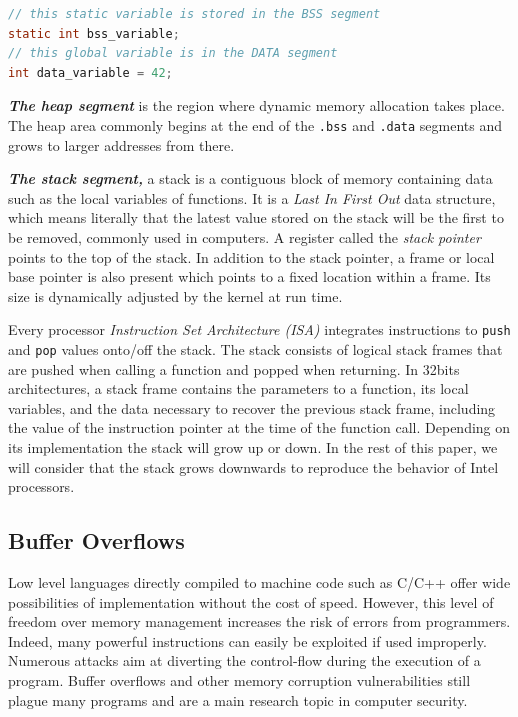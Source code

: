\documentclass[10pt,twocolumn]{article}
\begin{document}
\begin{lstlisting}[aboveskip=\bigskipamount,belowskip=\medskipamount,caption=Variable
location in memory,language=C,label=lst-variable] 
// this static variable is stored in the BSS segment
static int bss_variable;
// this global variable is in the DATA segment
int data_variable = 42; 
\end{lstlisting}

\textbf{\textit{The heap segment}} is the region where dynamic memory
allocation takes place. The heap area commonly begins at the end of the
\texttt{.bss} and \texttt{.data} segments and grows to larger addresses from
there.

\textit{\textbf{The stack segment,}} a stack is a contiguous block of memory
containing data such as the local variables of functions. It is a \textit{Last In First Out} data structure, which means
literally that the latest value stored on the stack will be the first to be
removed, commonly used
in computers. A register called the \textit{stack pointer} points to
the top of the stack. In addition to the stack pointer, a frame or local base
pointer is also present which points to a fixed location within a frame. Its
size is dynamically adjusted by the kernel at run time.

Every processor \textit{Instruction Set Architecture (ISA)} integrates
instructions to \texttt{push} and \texttt{pop} values onto/off the stack. The
stack consists of logical stack frames that are pushed when calling a function
and popped when returning. In 32bits architectures, a stack frame contains the
parameters to a function, its local variables, and the data necessary to
recover the previous stack frame, including the value of the instruction
pointer at the time of the function call. Depending on its implementation the
stack will grow up or down. In the rest of this paper, we will consider that
the stack grows downwards to reproduce the behavior of Intel processors.

\subsection{Buffer Overflows}

Low level languages directly compiled to machine code such as C/C++ offer wide
possibilities of implementation without the cost of speed. However, this level
of freedom over memory management increases the risk of errors from programmers.
Indeed, many powerful instructions can easily be exploited if used improperly.
Numerous attacks aim at diverting the control-flow during the execution of a
program. Buffer overflows and other memory corruption vulnerabilities still plague many programs and are a main research
topic in computer
security\cite{DBLP:journals/iee/MouzaraniSZ16,DBLP:journals/iee/PadmanabhuniT16,DBLP:conf/ant/LeonB16}.
\end{document}
